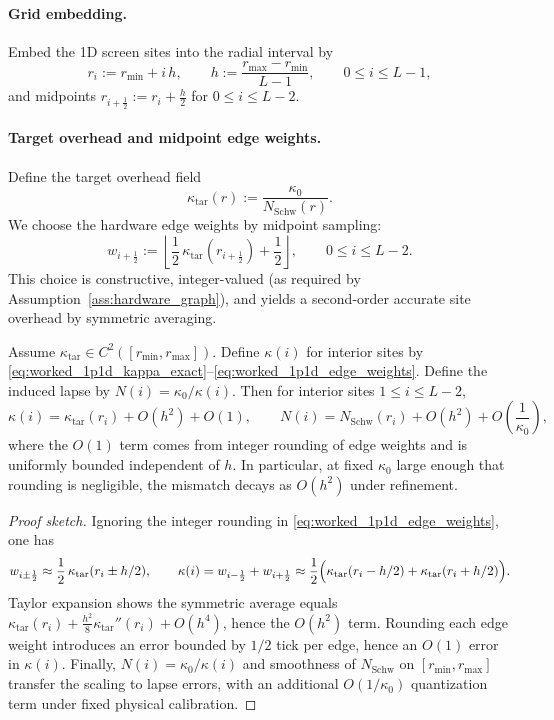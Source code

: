 \paragraph{Grid embedding.}
Embed the 1D screen sites into the radial interval by
\[
r_i:=r_{\min}+i\,h,
\qquad
h:=\frac{r_{\max}-r_{\min}}{L-1},
\qquad 0\le i\le L-1,
\]
and midpoints $r_{i+\frac12}:=r_i+\frac{h}{2}$ for $0\le i\le L-2$.

\paragraph{Target overhead and midpoint edge weights.}
Define the target overhead field
\[
\kappa_{\mathrm{tar}}(r):=\frac{\kappa_0}{N_{\mathrm{Schw}}(r)}.
\]
We choose the hardware edge weights by midpoint sampling:
\begin{equation}
\label{eq:worked_1p1d_edge_weights}
w_{i+\frac12}:=\left\lfloor \frac{1}{2}\,\kappa_{\mathrm{tar}}(r_{i+\frac12})+\frac12\right\rfloor,
\qquad 0\le i\le L-2.
\end{equation}
This choice is constructive, integer-valued (as required by Assumption~\ref{ass:hardware_graph}), and yields a second-order accurate site overhead by symmetric averaging.

\begin{proposition}
\label{prop:worked_1p1d_second_order}
Assume $\kappa_{\mathrm{tar}}\in C^2([r_{\min},r_{\max}])$.
Define $\kappa(i)$ for interior sites by \eqref{eq:worked_1p1d_kappa_exact}--\eqref{eq:worked_1p1d_edge_weights}.
Define the induced lapse by $N(i)=\kappa_0/\kappa(i)$.
Then for interior sites $1\le i\le L-2$,
\[
\kappa(i)=\kappa_{\mathrm{tar}}(r_i)+O(h^2)+O(1),
\qquad
N(i)=N_{\mathrm{Schw}}(r_i)+O(h^2)+O\!\left(\frac{1}{\kappa_0}\right),
\]
where the $O(1)$ term comes from integer rounding of edge weights and is uniformly bounded independent of $h$.
In particular, at fixed $\kappa_0$ large enough that rounding is negligible, the mismatch decays as $O(h^2)$ under refinement.
\end{proposition}

\begin{proof}[Proof sketch]
Ignoring the integer rounding in \eqref{eq:worked_1p1d_edge_weights}, one has
\[
w_{i\pm\frac12}\approx \frac12\,\kappa_{\mathrm{tar}}(r_i\pm h/2),
\qquad
\kappa(i)=w_{i-\frac12}+w_{i+\frac12}\approx \frac12\Bigl(\kappa_{\mathrm{tar}}(r_i-h/2)+\kappa_{\mathrm{tar}}(r_i+h/2)\Bigr).
\]
Taylor expansion shows the symmetric average equals $\kappa_{\mathrm{tar}}(r_i)+\frac{h^2}{8}\kappa_{\mathrm{tar}}''(r_i)+O(h^4)$, hence the $O(h^2)$ term.
Rounding each edge weight introduces an error bounded by $1/2$ tick per edge, hence an $O(1)$ error in $\kappa(i)$.
Finally, $N(i)=\kappa_0/\kappa(i)$ and smoothness of $N_{\mathrm{Schw}}$ on $[r_{\min},r_{\max}]$ transfer the scaling to lapse errors, with an additional $O(1/\kappa_0)$ quantization term under fixed physical calibration.
\end{proof}

